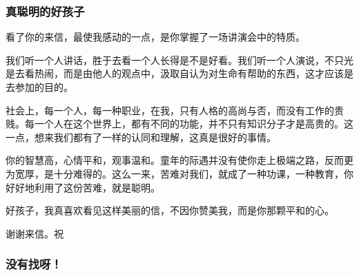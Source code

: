 \subsubsection{真聪明的好孩子}



\par {}
\par 看了你的来信，最使我感动的一点，是你掌握了一场讲演会中的特质。
\par 我们听一个人讲话，胜于去看一个人长得是不是好看。我们听一个人演说，不只光是去看热闹，而是由他人的观点中，汲取自认为对生命有帮助的东西，这才应该是去参加的目的。
\par 社会上，每一个人，每一种职业，在我，只有人格的高尚与否，而没有工作的贵贱。每一个人在这个世界上，都有不同的功能，并不只有知识分子才是高贵的。这一点，想来我们都有了一样的认同和理解，这真是很好的事情。
\par 你的智慧高，心情平和，观事温和。童年的际遇并没有使你走上极端之路，反而更为宽厚，是十分难得的。这么一来，苦难对我们，就成了一种功课，一种教育，你好好地利用了这份苦难，就是聪明。
\par 好孩子，我真喜欢看见这样美丽的信，不因你赞美我，而是你那颗平和的心。
\par 谢谢来信。祝
\par {}
\par {}


\subsubsection{没有找呀！}

